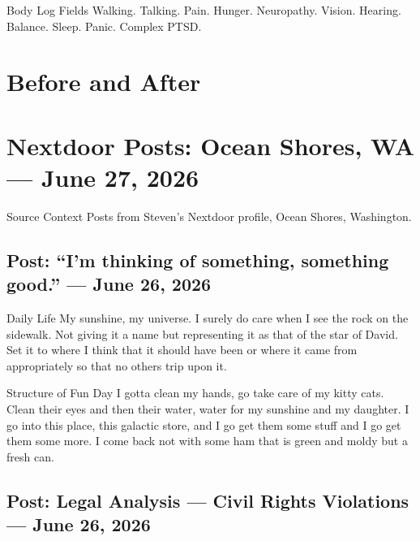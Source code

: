 \documentclass[12pt,openany]{book}
\begin{document}
\begin{writbox}{Body Log Fields}
Walking. Talking. Pain. Hunger. Neuropathy. Vision. Hearing. Balance. Sleep. Panic. Complex PTSD.
\end{writbox}

\verify

\chapter{Before and After}
\unknown

\chapter{Nextdoor Posts: Ocean Shores, WA --- June 27, 2026}

\begin{writbox}{Source Context}
Posts from Steven's Nextdoor profile, Ocean Shores, Washington.
\end{writbox}

\section{Post: ``I'm thinking of something, something good.'' --- June 26, 2026}

\begin{evidencebox}{Daily Life}
My sunshine, my universe. I surely do care when I see the rock on the sidewalk. Not giving it a name but representing it as that of the star of David. Set it to where I think that it should have been or where it came from appropriately so that no others trip upon it.
\end{evidencebox}

\begin{evidencebox}{Structure of Fun Day}
I gotta clean my hands, go take care of my kitty cats. Clean their eyes and then their water, water for my sunshine and my daughter. I go into this place, this galactic store, and I go get them some stuff and I go get them some more. I come back not with some ham that is green and moldy but a fresh can.
\end{evidencebox}

\section{Post: Legal Analysis --- Civil Rights Violations --- June 26, 2026}
\end{document}
